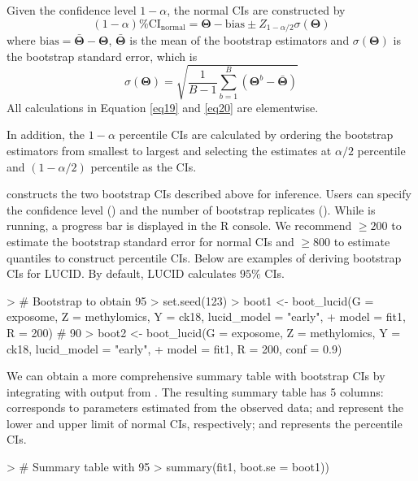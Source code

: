 Given the confidence level $1 - \alpha$, the normal CIs are constructed by 
\begin{equation}
    (1 - \alpha)\% \text{CI}_{\text{normal}} = \bm{\Theta} - \text{bias} \pm Z_{1 - \alpha/2}\sigma(\bm \Theta)
    \label{eq19}
\end{equation}
where $\text{bias} = \bar{\bm \Theta} - \bm{\Theta}$, $\bar{\bm \Theta}$ is the mean of the bootstrap estimators and $\sigma(\bm \Theta)$ is the bootstrap standard error, which is
\begin{equation}
    \sigma(\bm \Theta) = \sqrt{\frac{1}{B - 1}\sum_{b=1}^B\left(\bm{\Theta}^b - \bar{\bm \Theta}\right)}
    \label{eq20}
\end{equation}
All calculations in Equation \ref{eq19} and \ref{eq20} are elementwise.

In addition, the $1 - \alpha$ percentile CIs are calculated by ordering the bootstrap estimators from smallest to largest and selecting the estimates at $\alpha/2$ percentile and $(1 - \alpha/2)$ percentile as the CIs.

 constructs the two bootstrap CIs described above for inference. Users can specify the confidence level () and the number of bootstrap replicates (). While  is running, a progress bar is displayed in the R console. We recommend  $\geq 200$ to estimate the bootstrap standard error for normal CIs and  $\geq 800$ to estimate quantiles to construct percentile CIs. Below are examples of deriving bootstrap CIs for LUCID. By default, LUCID calculates $95\%$ CIs.
\begin{example}
> # Bootstrap to obtain 95%
> set.seed(123)
> boot1 <- boot_lucid(G = exposome, Z = methylomics, Y = ck18, lucid_model = "early", 
+                     model = fit1, R = 200)
# 90%
> boot2 <- boot_lucid(G = exposome, Z = methylomics, Y = ck18, lucid_model = "early", 
+                     model = fit1, R = 200, conf = 0.9)
\end{example}

We can obtain a more comprehensive summary table with bootstrap CIs by integrating  with output from . The resulting summary table has 5 columns:  corresponds to parameters estimated from the observed data;  and  represent the lower and upper limit of normal CIs, respectively;  and  represents the percentile CIs.
\begin{example}
> # Summary table with 95%
> summary(fit1, boot.se = boot1))
\end{example}

